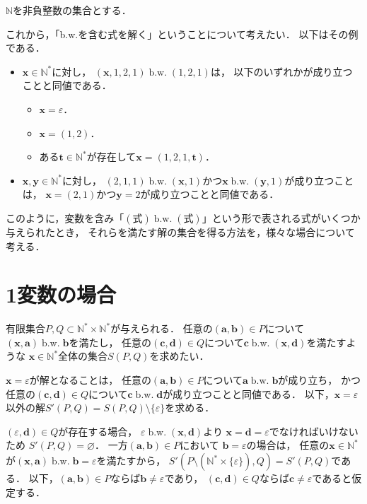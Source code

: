 \documentclass{ltjsarticle}
\newcommand\NN{\mathbb{N}}
\newcommand\bw{\mathrel{\text{b.w.}}}
\begin{document}
$\NN$を非負整数の集合とする．

これから，「b.w.を含む式を解く」ということについて考えたい．
以下はその例である．
\begin{itemize}
  \item $\boldsymbol{x} \in \NN^*$に対し，
    $(\boldsymbol{x}, 1, 2, 1) \bw (1, 2, 1)$は，
    以下のいずれかが成り立つことと同値である．
    \begin{itemize}
      \item $\boldsymbol{x} = \varepsilon$．
      \item $\boldsymbol{x} = (1, 2)$．
      \item ある$\boldsymbol{t} \in \NN^*$が存在して$\boldsymbol{x} = (1, 2, 1, \boldsymbol{t})$．
    \end{itemize}
  \item $\boldsymbol{x}, \boldsymbol{y} \in \NN^*$に対し，
    $(2, 1, 1) \bw (\boldsymbol{x}, 1)$かつ$\boldsymbol{x} \bw (\boldsymbol{y}, 1)$が成り立つことは，
    $\boldsymbol{x} = (2, 1)$かつ$\boldsymbol{y} = 2$が成り立つことと同値である．
\end{itemize}

このように，変数を含み「$(式) \bw (式)$」という形で表される式がいくつか与えられたとき，
それらを満たす解の集合を得る方法を，様々な場合について考える．
\section{1変数の場合}
有限集合$P, Q \subset \NN^* \times \NN^*$が与えられる．
任意の$(\boldsymbol{a}, \boldsymbol{b}) \in P$について$(\boldsymbol{x}, \boldsymbol{a}) \bw \boldsymbol{b}$を満たし，
任意の$(\boldsymbol{c}, \boldsymbol{d}) \in Q$について$\boldsymbol{c} \bw (\boldsymbol{x}, \boldsymbol{d})$を満たすような
$\boldsymbol{x} \in \NN^*$全体の集合$S(P, Q)$を求めたい．

$\boldsymbol{x} = \varepsilon$が解となることは，
任意の$(\boldsymbol{a}, \boldsymbol{b}) \in P$について$\boldsymbol{a} \bw \boldsymbol{b}$が成り立ち，
かつ任意の$(\boldsymbol{c}, \boldsymbol{d}) \in Q$について$\boldsymbol{c} \bw \boldsymbol{d}$が成り立つことと同値である．
以下，$\boldsymbol{x} = \varepsilon$以外の解$S'(P, Q) = S(P, Q) \setminus \{\varepsilon\}$を求める．

$(\varepsilon, \boldsymbol{d}) \in Q$が存在する場合，
$\varepsilon \bw (\boldsymbol{x}, \boldsymbol{d})$より
$\boldsymbol{x} = \boldsymbol{d} = \varepsilon$でなければいけないため
$S'(P, Q) = \varnothing$．
一方$(\boldsymbol{a}, \boldsymbol{b}) \in P$において
$\boldsymbol{b} = \varepsilon$の場合は，
任意の$\boldsymbol{x} \in \NN^*$が$(\boldsymbol{x}, \boldsymbol{a}) \bw \boldsymbol{b} = \varepsilon$を満たすから，
$S'(P \setminus (\NN^* \times \{ \varepsilon \}), Q) = S'(P, Q)$である．
以下，$(\boldsymbol{a}, \boldsymbol{b}) \in P$ならば$\boldsymbol{b} \ne \varepsilon$であり，
$(\boldsymbol{c}, \boldsymbol{d}) \in Q$ならば$\boldsymbol{c} \ne \varepsilon$であると仮定する．
\end{document}
